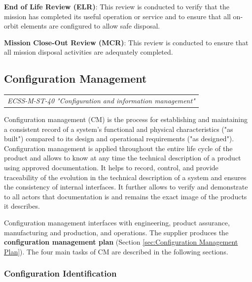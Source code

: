 \textbf{End of Life Review (ELR)}: This review is conducted to verify that the mission has completed its useful operation or service and to ensure that all on-orbit elements are configured to allow safe disposal.

\textbf{Mission Close-Out Review (MCR)}: This review is conducted to ensure that all mission disposal activities are adequately completed.

\subsection{Configuration Management}
\label{sec:Configuration Management}

\begin{tabular}{l}
\textit{ECSS-M-ST-40 "Configuration and information management" \cite{ECSS-M-ST-40}}
\end{tabular}

Configuration management (CM) is the process for establishing and maintaining a consistent record of a system's functional and physical characteristics ("as built") compared to its design and operational requirements ("as designed"). Configuration management is applied throughout the entire life cycle of the product and allows to know at any time the technical description of a product using approved documentation. It helps to record, control, and provide traceability of the evolution in the technical description of a system and ensures the consistency of internal interfaces. It further allows to verify and demonstrate to all actors that documentation is and remains the exact image of the products it describes.

Configuration management interfaces with engineering, product assurance, manufacturing and production, and operations. The supplier produces the \textbf{configuration management plan} (Section \ref{sec:Configuration Management Plan}). The four main tasks of CM are described in the following sections.

\subsubsection{Configuration Identification}

